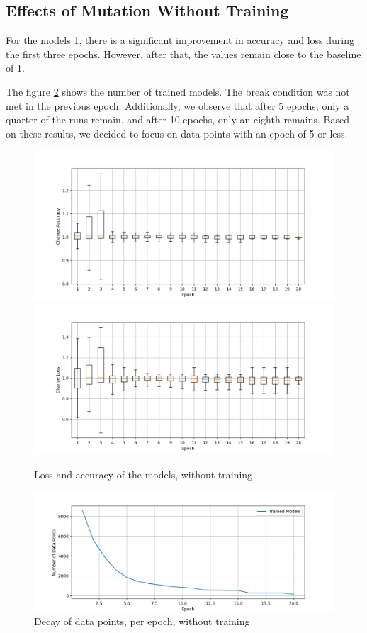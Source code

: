 \subsection{Effects of Mutation Without Training}\label{subsec:effects-of-mutation-without-training}
For the models \ref{fig:loss-accuracy-Notraining}, there is a significant improvement in accuracy and loss during the first three epochs.
However, after that, the values remain close to the baseline of 1.

The figure \ref{fig:decay_Notraining} shows the number of trained models.
The break condition was not met in the previous epoch.
Additionally, we observe that after 5 epochs, only a quarter of the runs remain, and after 10 epochs, only an eighth remains.
Based on these results, we decided to focus on data points with an epoch of 5 or less.
\begin{figure}
    \centering
    \includegraphics[width=\textwidth]{plots/NotTrained_Change_Acc.png}
    \includegraphics[width=\textwidth]{plots/NotTrained_Change_Loss.png}
    \caption{Loss and accuracy of the models, without training}
    \label{fig:loss-accuracy-Notraining}
\end{figure}
\begin{figure}
    \centering
    \includegraphics[width=\textwidth]{plots/NotTrained_Points_perEpoch.png}
    \caption{Decay of data points, per epoch, without training}
    \label{fig:decay_Notraining}
\end{figure}
